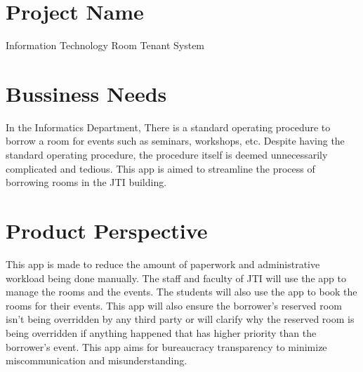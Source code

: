 \documentclass[12pt,titlepage,a4paper]{report}
\begin{document}
    \section{Project Name}
    Information Technology Room Tenant System
    \section{Bussiness Needs}
    In the Informatics Department, There is a standard operating procedure to borrow a room for events such as seminars, workshops, etc. Despite having the standard operating procedure, the procedure itself is deemed unnecessarily complicated and tedious. This app is aimed to streamline the process of borrowing rooms in the JTI building.
    \section{Product Perspective}
    This app is made to reduce the amount of paperwork and administrative workload being done manually. The staff and faculty of JTI will use the app to manage the rooms and the events. The students will also use the app to book the rooms for their events. This app will also ensure the borrower's reserved room isn't being overridden by any third party or will clarify why the reserved room is being overridden if anything happened that has higher priority than the borrower's event. This app aims for bureaucracy transparency to minimize miscommunication and misunderstanding.
\end{document}
